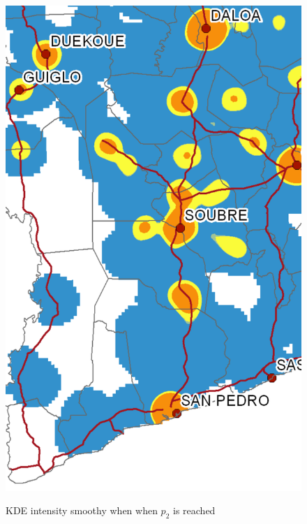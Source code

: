 \begin{figure}
{    \includegraphics[scale = 0.15]{results/images/kernel/l_hour20_kd_detail.pdf}
	\label{fig:subfig2_detail}
}
\caption[KDE intensity smoothy when $p_2$ is reached]{KDE intensity smoothy when when  $p_2$ is reached}
\label{fig:subfigureExample}
\end{figure}




\newpage

